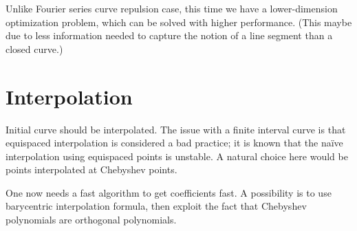 \documentclass[a4paper]{article}
\begin{document}
Unlike Fourier series curve repulsion case, this time we have a lower-dimension optimization problem, which can be solved with higher performance.
(This maybe due to less information needed to capture the notion of a line segment than a closed curve.)

\section{Interpolation}
Initial curve should be interpolated.
The issue with a finite interval curve is that equispaced interpolation is considered a bad practice; it is known that the na\"ive interpolation using equispaced points is unstable.
A natural choice here would be points interpolated at Chebyshev points.

One now needs a fast algorithm to get coefficients fast.
A possibility is to use barycentric interpolation formula, then exploit the fact that Chebyshev polynomials are orthogonal polynomials.
\end{document}

